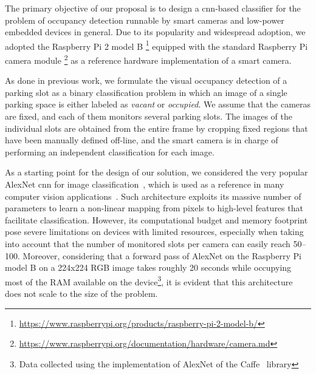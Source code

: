 The primary objective of our proposal is to design a \gls{cnn}-based classifier for the problem of occupancy detection runnable by smart cameras and low-power embedded devices in general.
Due to its popularity and widespread adoption, we adopted the Raspberry Pi 2 model B \footnote{\url{https://www.raspberrypi.org/products/raspberry-pi-2-model-b/}} equipped with the standard Raspberry Pi camera module \footnote{\url{https://www.raspberrypi.org/documentation/hardware/camera.md}} as a reference hardware implementation of a smart camera.

As done in previous work, we formulate the visual occupancy detection of a parking slot as a binary classification problem in which an image of a single parking space is either labeled as \emph{vacant} or \emph{occupied}.
We assume that the cameras are fixed, and each of them monitors several parking slots.
The images of the individual slots are obtained from the entire frame by cropping fixed regions that have been manually defined off-line, and the smart camera is in charge of performing an independent classification for each image.

As a starting point for the design of our solution, we considered the very popular AlexNet \gls{cnn} for image classification~\cite{krizhevsky2012imagenet}, which is used as a reference in many computer vision applications~\cite{}.
Such architecture exploits its massive number of parameters to learn a non-linear mapping from pixels to high-level features that facilitate classification.
However, its computational budget and memory footprint pose severe limitations on devices with limited resources, especially when taking into account that the number of monitored slots per camera can easily reach 50--100.
Moreover, considering that a forward pass of AlexNet on the Raspberry Pi model B on a 224x224 RGB image takes roughly 20 seconds while occupying most of the RAM available on the device\footnote{Data collected using the implementation of AlexNet of the Caffe~\cite{jia2014caffe} library}, it is evident that this architecture does not scale to the size of the problem.

